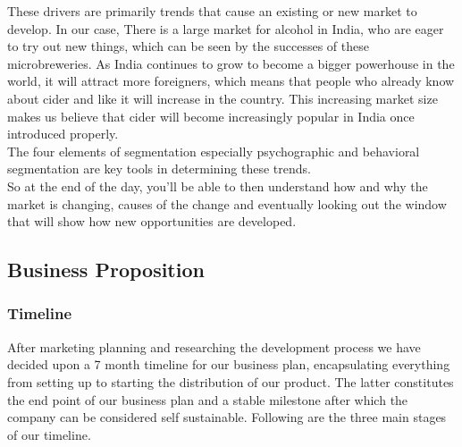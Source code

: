 \documentclass[11pt]{article}
\begin{document}
\noindent These drivers are primarily trends that cause an existing or new market to develop. In our case, There is a large market for alcohol in India, who are eager to try out new things, which can be seen by the successes of these microbreweries. As India continues to grow to become a bigger powerhouse in the world, it will attract more foreigners, which means that people who already know about cider and like it will increase in the country. This increasing market size makes us believe that cider will become increasingly popular in India once introduced properly. \\

\noindent The four elements of segmentation especially psychographic and behavioral segmentation are key tools in determining these trends. \\

\noindent So at the end of the day, you'll be able to then understand how and why the market is changing, causes of the change and eventually looking out the window that will show how new opportunities are developed. \\

  \subsection{Business Proposition}

  \subsubsection{Timeline}
After marketing planning and researching the development process we have decided upon a 7 month timeline for our business plan, encapsulating everything from setting up to starting the distribution of our product. The latter constitutes the end point of our business plan and a stable milestone after which the company can be considered self sustainable. Following are the three main stages of our timeline.
\end{document}
